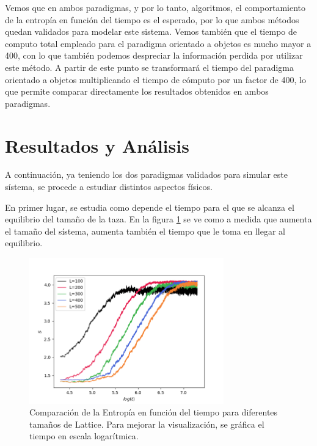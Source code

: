 \documentclass[12pt,twocolumn]{article}
\begin{document}
Vemos que en ambos paradigmas, y por lo tanto, algoritmos, el comportamiento de la entropía en función del tiempo es el esperado, por lo que ambos métodos quedan validados para modelar este sistema. Vemos también que el tiempo de computo total empleado para el paradigma orientado a objetos es mucho mayor a 400, con lo que también podemos despreciar la información perdida por utilizar este método. A partir de este punto se transformará el tiempo del paradigma orientado a objetos multiplicando el tiempo de cómputo por un factor de 400, lo que permite comparar directamente los resultados obtenidos en ambos paradigmas.

\section{Resultados y Análisis}

A continuación, ya teniendo los dos paradigmas validados para simular este sístema, se procede a estudiar distintos aspectos físicos.

En primer lugar, se estudia como depende el tiempo para el que se alcanza el equilibrio del tamaño de la taza. En la figura \ref{fig:S_vs_t_sizes} se ve como a medida que aumenta el tamaño del sístema, aumenta también el tiempo que le toma en llegar al equilibrio.

\begin{figure}
    \centering
    \includegraphics[width=0.75\textwidth]{figs/S_vs_t_sizes.png}
    \caption{Comparación de la Entropía en función del tiempo para diferentes tamaños de Lattice. Para mejorar la visualización, se gráfica el tiempo en escala logarítmica.}
    \label{fig:S_vs_t_sizes}
\end{figure}
\end{document}
